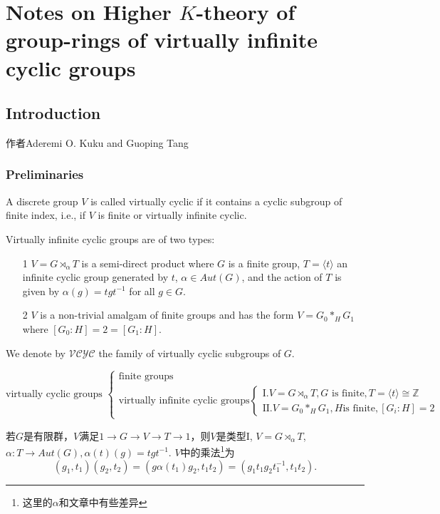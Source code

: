 \chapter{Notes on Higher $K$-theory of group-rings of virtually infinite cyclic groups}
\section{Introduction}
作者Aderemi O. Kuku and Guoping Tang
\subsection{Preliminaries}
\begin{definition}
A discrete group $V$ is called virtually cyclic if it contains a cyclic subgroup of finite index, i.e., if $V$ is finite or virtually infinite cyclic.
\end{definition}
Virtually infinite cyclic groups are of two types:
\begin{itemize}
 	\item[1]  $V = G \rtimes_{\alpha} T$ is a semi-direct product where $G$ is a finite group, $T = \langle t \rangle$ an infinite cyclic group generated by $t$, $\alpha \in Aut(G)$, and the action of $T$ is given by $\alpha(g )= tgt^{-1}$ for all $g\in G$.
 	\item[2] $V$ is a non-trivial amalgam of finite groups and has the form $V =G_0 *_H	G_1$ where $[G_0: H ]=2=[ G_1 :H]$.

 \end{itemize}
  We denote by $\mathcal{VCYC}$ the family of virtually cyclic subgroups of $G$.

\begin{equation*}
\text{virtually cyclic groups }
\begin{cases}
\text{finite groups}\\
\text{virtually infinite cyclic groups}
\begin{cases}
\text{I.}V=G\rtimes_\alpha T,G\text{ is finite},T=\langle t\rangle \cong \mathbb{Z} \\
\text{II.}V=G_0\ast_H G_1,H \text{is finite},[G_i:H]=2
\end{cases}
\end{cases}
\end{equation*}

若$G$是有限群，$V$满足$1\to G\to V\to T\to 1$，则$V$是类型I, $V=G\rtimes_\alpha T$, $\alpha:T\rightarrow Aut(G), \alpha (t)(g)=tgt^{-1}$. $V$中的乘法\footnote{这里的$\alpha$和文章中有些差异}为
\[(g_1,t_1)(g_2,t_2)=(g\alpha(t_1)g_2,t_1t_2)=(g_1t_1g_2t_1^{-1},t_1t_2).\]


